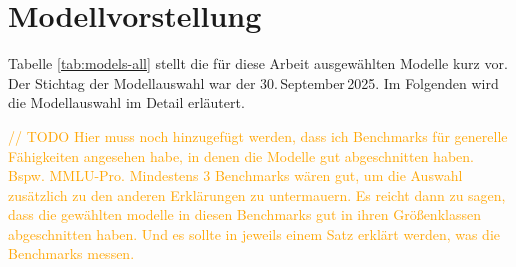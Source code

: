 \section{Modellvorstellung}\label{sec:modellvorstellung}

Tabelle \ref{tab:models-all} stellt die für diese Arbeit ausgewählten Modelle kurz vor. Der Stichtag der Modellauswahl war der 30.\,September\,2025. Im Folgenden wird die Modellauswahl im Detail erläutert.

\textcolor{orange}{// TODO Hier muss noch hinzugefügt werden, dass ich Benchmarks für generelle Fähigkeiten angesehen habe, in denen die Modelle gut abgeschnitten haben. Bspw. MMLU-Pro. Mindestens 3 Benchmarks wären gut, um die Auswahl zusätzlich zu den anderen Erklärungen zu untermauern. Es reicht dann zu sagen, dass die gewählten modelle in diesen Benchmarks gut in ihren Größenklassen abgeschnitten haben. Und es sollte in jeweils einem Satz erklärt werden, was die Benchmarks messen.}

